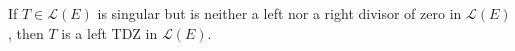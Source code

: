 If $T \in \mathcal{L}(E)$ is singular but is neither a left nor a right divisor of zero in $\mathcal{L}(E)$, then $T$ is a left TDZ in $\mathcal{L}(E)$.
